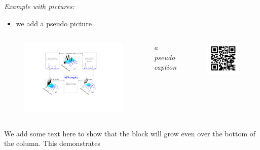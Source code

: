 
\alert{\textit{Example with pictures:}}
\begin{itemize}
	\item we add a pseudo picture
\end{itemize}
\vspace{1cm}
\begin{columns}
	\begin{figure}[tb]
	\begin{center}
		\includegraphics[width=.55\textwidth]{images/content/FIG1.pdf}
	\end{center}
	\end{figure}
\small{\textit{a pseudo caption}}
\vspace{4cm}
	\begin{figure}[tb]
		\includegraphics[width=.6\textwidth]{images/qrcode-RSCAPE.jpg}
	\end{figure}
\end{columns}
\vspace{1cm}
We add some text here to show that the block will grow even over the bottom of the column. This demonstrates
